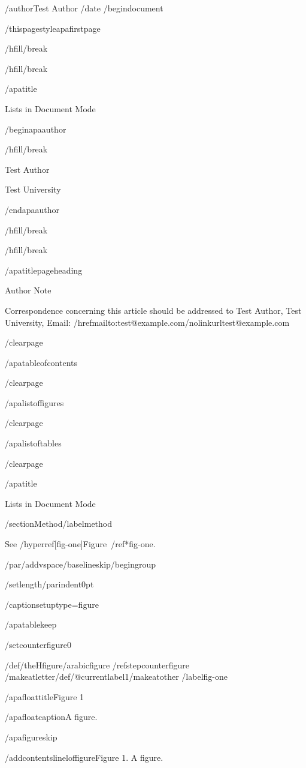 /author{Test Author}
/date{}
/begin{document}


/thispagestyle{apafirstpage}

/hfill/break

/hfill/break

/apatitle{

Lists in Document Mode

}

/begin{apaauthor}

/hfill/break

Test Author

Test University

/end{apaauthor}

/hfill/break

/hfill/break

/apatitlepageheading{

Author Note

}

Correspondence concerning this article should be addressed to Test
Author, Test University, Email:
/href{mailto:test@example.com}{/nolinkurl{test@example.com}}

/clearpage

/apatableofcontents

/clearpage

/apalistoffigures

/clearpage

/apalistoftables

/clearpage

/apatitle{

Lists in Document Mode

}

/section{Method}/label{method}

See /hyperref[fig-one]{Figure~/ref*{fig-one}}.

/par/addvspace{/baselineskip}/begingroup

/setlength{/parindent}{0pt}

/captionsetup{type=figure}

/apatablekeep

/setcounter{figure}{0}

/def/theHfigure{/arabic{figure}}%
/refstepcounter{figure}%
/makeatletter/def/@currentlabel{1}/makeatother%
/label{fig-one}

/apafloattitle{Figure 1}

/apafloatcaption{A figure.}

/apafigureskip

/addcontentsline{lof}{figure}{Figure 1. A figure.}

